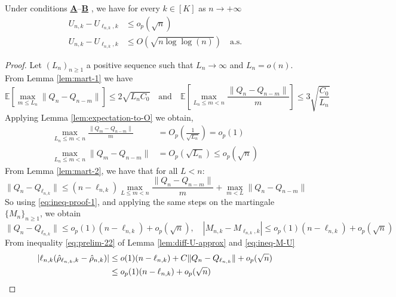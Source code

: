 \begin{lemma}\label{lem:U-ineq}
	Under conditions \hyperlink{CA}{\textbf{A}}--\hyperlink{CB}{\textbf{B}} , we have for every \(k \in [K]\) as \(n \to +\infty\)	
	\begin{align}
		U_{n,k} - U_{\ell_{n,k},k} &\leq o_p(\sqrt{n})\label{eq:ineq-U-1}\\
		U_{n,k} - U_{\ell_{n,k},k} &\leq O(\sqrt{n \log \log(n)}) \quad \text{a.s.}\label{eq:ineq-U-2}
	\end{align}
\end{lemma}	
\begin{proof}
	Let \((L_n)_{n \geq 1}\) a positive sequence such that $L_n \to \infty$ and $L_n = o(n)$. From Lemma \ref{lem:mart-1} we have
	\begin{equation*}
		\mathbb{E}\left[\max_{m \leq L_n} \|Q_n - Q_{n-m}\| \right] \leq 2\sqrt{L_n C_0}
		\quad \text{and} \quad \mathbb{E}\left[\max_{L_n \leq m < n} \frac{\|Q_n - Q_{n-m}\|}{m} \right] \leq 3\sqrt{\frac{C_0}{L_n}}  
	\end{equation*}
	Applying Lemma \ref{lem:expectation-to-O} we obtain,
	\begin{align*}
		\max_{L_n \leq m < n} \frac{\|Q_m - Q_{n-m}\|}{m} &= O_p\left(\frac{1}{\sqrt{L_n}}\right) = o_p(1)\\ 
		\max_{L_n \leq m < n} \|Q_m - Q_{n-m}\| &= O_p(\sqrt{L_n}) \leq o_p(\sqrt{n})
	\end{align*}
	From Lemma \ref{lem:mart-2}, we have that for all \(L < n\):
	\begin{equation}\label{eq:ineq-proof-1}
		\|Q_n - Q_{\ell_{n,k}}\| \leq (n - \ell_{n,k}) \max_{L \leq m < n} \frac{\|Q_n - Q_{n-m}\|}{m} + \max_{m < L} \|Q_n - Q_{n-m}\|
	\end{equation}
	So using \eqref{eq:ineq-proof-1}, and applying the same steps on the martingale \(\{M_n\}_{n \geq 1}\), we obtain
	\begin{equation}\label{eq:ineq-M-U}
		\|Q_n - Q_{\ell_{n,k}}\| \leq o_p(1)(n - \ell_{n,k}) + o_p(\sqrt{n}), \quad |M_{n,k} - M_{\ell_{n,k},k}| \leq o_p(1)(n - \ell_{n,k}) + o_p(\sqrt{n})
	\end{equation}	
	From inequality \eqref{eq:prelim-22} of Lemma \ref{lem:diff-U-approx} and \eqref{eq:ineq-M-U}
	\begin{align}
		|\ell_{n,k} (\hat{\rho}_{\ell_{n,k},k} - \hat{\rho}_{n,k})| &\leq o(1)(n - \ell_{n,k}) + C \|Q_n - Q_{\ell_{n,k}}\| + o_p(\sqrt{n})\notag\\
		&\leq o_p(1)(n - \ell_{n,k}) + o_p(\sqrt{n})\label{eq:ineq_ell}
	\end{align}

\end{proof}
